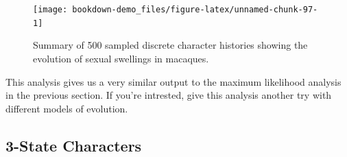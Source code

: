 \documentclass[
]{book}
\newenvironment{Shaded}{\begin{snugshade}}{\end{snugshade}}
\newcommand{\DataTypeTok}[1]{\textcolor[rgb]{0.13,0.29,0.53}{#1}}
\newcommand{\DecValTok}[1]{\textcolor[rgb]{0.00,0.00,0.81}{#1}}
\newcommand{\FloatTok}[1]{\textcolor[rgb]{0.00,0.00,0.81}{#1}}
\newcommand{\KeywordTok}[1]{\textcolor[rgb]{0.13,0.29,0.53}{\textbf{#1}}}
\newcommand{\NormalTok}[1]{#1}
\newcommand{\OperatorTok}[1]{\textcolor[rgb]{0.81,0.36,0.00}{\textbf{#1}}}
\newcommand{\StringTok}[1]{\textcolor[rgb]{0.31,0.60,0.02}{#1}}
\begin{document}
\begin{Shaded}
\end{Shaded}

\begin{figure}[H]

{\centering \texttt{[image: bookdown-demo\_files/figure-latex/unnamed-chunk-97-1]} 

}

\caption{Summary of 500 sampled discrete character histories showing the evolution of sexual swellings in macaques.}\label{fig:unnamed-chunk-97}
\end{figure}

This analysis gives us a very similar output to the maximum likelihood analysis in the previous section. If you're intrested, give this analysis another try with different models of evolution.

\hypertarget{state-characters-1}{%
\subsection{3-State Characters}\label{state-characters-1}}
\end{document}
